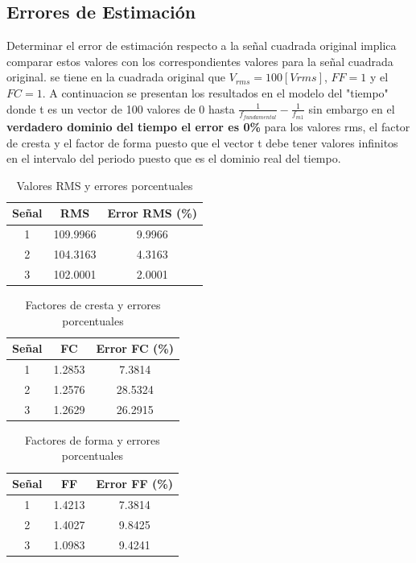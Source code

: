 \documentclass[conference]{IEEEtran}
\theoremstyle{mytheoremstyle}
\theoremstyle{mytheoremstyle}
\theoremstyle{myproblemstyle}
\begin{document}
        \subsection{Errores de Estimación}
        Determinar el error de estimación respecto a la señal cuadrada original implica comparar estos valores con los correspondientes valores para la señal cuadrada original. se tiene en la cuadrada original que $V_{rms}=100[Vrms]$, $FF = 1$ y el $FC=1$.
        A continuacion se presentan los resultados en el modelo del "tiempo" donde t es un vector de 100 valores de 0 hasta $\frac{1}{f_{fundamental}}-\frac{1}{f_{m1}}$ sin embargo en el \textbf{verdadero dominio del tiempo el error es 0\%} para los valores rms, el factor de cresta y el factor de forma puesto que el vector t debe tener valores infinitos en el intervalo del periodo puesto que es el dominio real del tiempo. 
        \begin{table}[h!]
            \centering
            \caption{Valores RMS y errores porcentuales}
            \begin{tabular}{|c|c|c|}
            \hline
            \textbf{Señal} & \textbf{RMS} & \textbf{Error RMS (\%)} \\ \hline
            1 & 109.9966 & 9.9966 \\ \hline
            2 & 104.3163 & 4.3163 \\ \hline
            3 & 102.0001 & 2.0001 \\ \hline
            \end{tabular}
            \label{tabla_rms}
        \end{table}
        \begin{table}[h!]
            \centering
            \caption{Factores de cresta y errores porcentuales}
            \begin{tabular}{|c|c|c|}
            \hline
            \textbf{Señal} & \textbf{FC} & \textbf{Error FC (\%)} \\ \hline
            1 & 1.2853 & 7.3814 \\ \hline
            2 & 1.2576 & 28.5324 \\ \hline
            3 & 1.2629 & 26.2915 \\ \hline
            \end{tabular}
            \label{tabla_factores_fc}
        \end{table}

        \begin{table}[h!]
            \centering
            \caption{Factores de forma y errores porcentuales}
            \begin{tabular}{|c|c|c|}
            \hline
            \textbf{Señal} & \textbf{FF} & \textbf{Error FF (\%)} \\ \hline
            1 & 1.4213 & 7.3814 \\ \hline
            2 & 1.4027 & 9.8425 \\ \hline
            3 & 1.0983 & 9.4241 \\ \hline
            \end{tabular}
            \label{tabla_factores_ff}
        \end{table}
        
\end{document}
